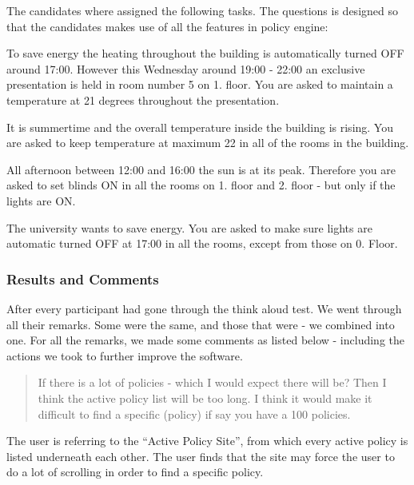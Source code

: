 The candidates where assigned the following tasks. The questions is designed so that the candidates makes use of all the features in policy engine:

\begin{framed}
To save energy the heating throughout the building is automatically turned OFF around 17:00. However this Wednesday around 19:00 - 22:00 an exclusive presentation is held in room number 5 on 1. floor.
You are asked to maintain a temperature at 21 degrees throughout the presentation.

\end{framed}


\begin{framed}
It is summertime and the overall temperature inside the building is rising. You are asked to keep temperature at maximum 22 in all of the rooms in the building.
\end{framed}


\begin{framed}
All afternoon between 12:00 and 16:00 the sun is at its peak. Therefore you are asked to set blinds ON in all the rooms on 1. floor and 2. floor - but only if the lights are ON.
\end{framed}

\begin{framed}
The university wants to save energy. You are asked to make sure lights are automatic turned OFF at 17:00 in all the rooms, except from those on 0. Floor.
\end{framed}



\subsubsection{Results and Comments}
\label{results-and-comments}
After every participant had gone through the think aloud test. We went through all their remarks. Some were the same, and those that were - we combined into one.
For all the remarks, we made some comments as listed below - including the actions we took to further improve the software.

\begin{quotation}
If there is a lot of policies - which I would expect there will be? Then I think the active policy list will be too long. I think it would make it difficult to find a specific (policy) if say you have a 100 policies.
\end{quotation}

The user is referring to the “Active Policy Site”, from which every active policy is listed underneath each other. The user finds that the site may force the user to do a lot of scrolling in order to find a specific policy.

